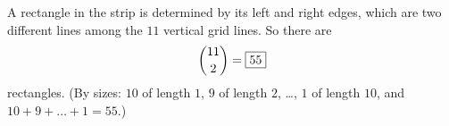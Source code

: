 A rectangle in the strip is determined by its left and right edges, which are two different lines among the $11$ vertical grid lines. So there are
\[
\dbinom{11}{2}=\boxed{55}
\]
rectangles. (By sizes: $10$ of length $1$, $9$ of length $2$, \dots, $1$ of length $10$, and $10+9+\dots+1=55$.)
